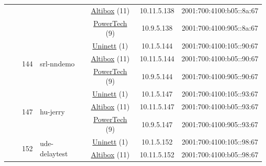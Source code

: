 \begin{small}
\begin{center}
\begin{longtable}{|c|c|c|c|c|c|c|c|}
  &  &  &  & \multicolumn{2}{|c|}{\tiny{\href{https://www.altibox.no}{Altibox} (11)}} & \tiny{10.11.5.138} & \tiny{2001:700:4100:b05::8a:67} \\* \cline{5-5}\cline{6-6}\cline{7-7}\cline{8-8}
  &  &  &  & \multicolumn{2}{|c|}{\tiny{\href{http://www.powertech.no}{PowerTech} (9)}} & \tiny{10.9.5.138} & \tiny{2001:700:4100:905::8a:67} \\* \cline{3-3}\cline{4-4}\cline{5-5}\cline{6-6}\cline{7-7}\cline{8-8}
  &  & \multirow{3}{*}{\tiny{144}} & \multicolumn{1}{|l|}{\multirow{3}{*}{\tiny{srl-nndemo}}} & \multicolumn{2}{|c|}{\tiny{\href{https://www.uninett.no}{Uninett} (1)}} & \tiny{10.1.5.144} & \tiny{2001:700:4100:105::90:67} \\* \cline{5-5}\cline{6-6}\cline{7-7}\cline{8-8}
  &  &  &  & \multicolumn{2}{|c|}{\tiny{\href{https://www.altibox.no}{Altibox} (11)}} & \tiny{10.11.5.144} & \tiny{2001:700:4100:b05::90:67} \\* \cline{5-5}\cline{6-6}\cline{7-7}\cline{8-8}
  &  &  &  & \multicolumn{2}{|c|}{\tiny{\href{http://www.powertech.no}{PowerTech} (9)}} & \tiny{10.9.5.144} & \tiny{2001:700:4100:905::90:67} \\* \cline{3-3}\cline{4-4}\cline{5-5}\cline{6-6}\cline{7-7}\cline{8-8}
  &  & \multirow{3}{*}{\tiny{147}} & \multicolumn{1}{|l|}{\multirow{3}{*}{\tiny{hu-jerry}}} & \multicolumn{2}{|c|}{\tiny{\href{https://www.uninett.no}{Uninett} (1)}} & \tiny{10.1.5.147} & \tiny{2001:700:4100:105::93:67} \\* \cline{5-5}\cline{6-6}\cline{7-7}\cline{8-8}
  &  &  &  & \multicolumn{2}{|c|}{\tiny{\href{https://www.altibox.no}{Altibox} (11)}} & \tiny{10.11.5.147} & \tiny{2001:700:4100:b05::93:67} \\* \cline{5-5}\cline{6-6}\cline{7-7}\cline{8-8}
  &  &  &  & \multicolumn{2}{|c|}{\tiny{\href{http://www.powertech.no}{PowerTech} (9)}} & \tiny{10.9.5.147} & \tiny{2001:700:4100:905::93:67} \\* \cline{3-3}\cline{4-4}\cline{5-5}\cline{6-6}\cline{7-7}\cline{8-8}
  &  & \multirow{3}{*}{\tiny{152}} & \multicolumn{1}{|l|}{\multirow{3}{*}{\tiny{ude-delaytest}}} & \multicolumn{2}{|c|}{\tiny{\href{https://www.uninett.no}{Uninett} (1)}} & \tiny{10.1.5.152} & \tiny{2001:700:4100:105::98:67} \\* \cline{5-5}\cline{6-6}\cline{7-7}\cline{8-8}
  &  &  &  & \multicolumn{2}{|c|}{\tiny{\href{https://www.altibox.no}{Altibox} (11)}} & \tiny{10.11.5.152} & \tiny{2001:700:4100:b05::98:67} \\* \cline{5-5}\cline{6-6}\cline{7-7}\cline{8-8}

\end{longtable}
\end{center}
\end{small}
